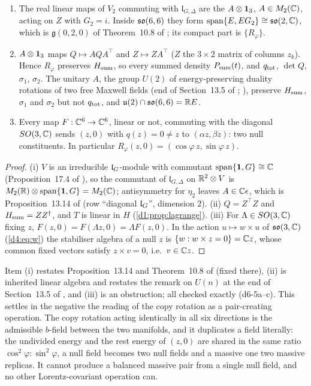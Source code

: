 \begin{proposition}
\label{d6:prop:covariant}
\begin{enumerate}[label=(\roman*),leftmargin=2.2em]
\item The real linear maps of $V_2$ commuting with $\mathfrak l_{G,\Delta}$ are the $A\otimes\mathbf 1_3$, $A\in M_2(\mathbb{C})$, acting on $Z$ with $G_2=i$. Inside
$\mathfrak{so}(6,6)$ they form $\operatorname{span}\{E,EG_2\}\cong\mathfrak{so}(2,\mathbb{C})$, which is $\mathfrak g(0,2,0)$ of Theorem~10.8 of \cite{ES17}; its compact part
is $\{R_\varphi\}$.
\item $A\otimes\mathbf 1_3$ maps $Q\mapsto AQA^{\!\top}$ and $Z\mapsto ZA^{\!\top}$ ($Z$ the $3\times2$ matrix of columns $z_k$). Hence $R_\varphi$ preserves
$H_{\rm sum}$, so every summed density $P_{\rm sum}(t)$, and $q_{\rm tot}$, $\det Q$, $\sigma_1$, $\sigma_2$. The unitary $A$, the group $U(2)$ of
energy-preserving duality rotations of two free Maxwell fields (end of Section~13.5 of \cite{ES17}; \cite{GaillardZumino81}), preserve
$H_{\rm sum}$, $\sigma_1$ and $\sigma_2$ but not $q_{\rm tot}$, and $\mathfrak{u}(2)\cap\mathfrak{so}(6,6)=\mathbb{R} E$.
\item Every map $F:\mathbb{C}^6\to\mathbb{C}^6$, linear or not, commuting with the diagonal $SO(3,\mathbb{C})$ sends $(z,0)$ with $q(z)=0\neq z$ to $(\alpha z,\beta z)$:
two null constituents. In particular $R_\varphi(z,0)=(\cos\varphi\,z,\sin\varphi\,z)$.
\end{enumerate}
\end{proposition}

\begin{proof}
(i) $V$ is an irreducible $\mathfrak l_G$-module with commutant $\operatorname{span}\{\mathbf 1,G\}\cong\mathbb{C}$ (Proposition~17.4 of \cite{ES17}), so the commutant
of $\mathfrak l_{G,\Delta}$ on $\mathbb{R}^2\otimes V$ is $M_2(\mathbb{R})\otimes\operatorname{span}\{\mathbf 1,G\}=M_2(\mathbb{C})$; antisymmetry for $\eta_2$ leaves $A\in\mathbb{C}\epsilon$, which
is Proposition~13.14 of \cite{ES17} (row ``diagonal $\mathfrak l_G$'', dimension $2$). (ii) $Q=Z^{\!\top}Z$ and $H_{\rm sum}=ZZ^\dagger$, and $T$ is linear in
$H$ (\cref{d1:prop:lagrange}). (iii) For $\Lambda\in SO(3,\mathbb{C})$ fixing $z$, $F(z,0)=F(\Lambda z,0)=\Lambda F(z,0)$. In the action $u\mapsto w\times u$
of $\mathfrak{so}(3,\mathbb{C})$ (\eqref{d4:eq:w}) the stabiliser algebra of a null $z$ is $\{w:w\times z=0\}=\mathbb{C} z$, whose common fixed vectors satisfy
$z\times v=0$, i.e.\ $v\in\mathbb{C} z$.
\end{proof}

Item (i) restates Proposition~13.14 and Theorem~10.8 of \cite{ES17} (fixed there), (ii) is inherited linear algebra and restates the remark
on $U(n)$ at the end of Section~13.5 of \cite{ES17}, and (iii) is an obstruction; all checked exactly (d6-5a--c). This settles in the negative the reading of the copy rotation
as a pair-creating operation. The copy rotation acting identically in all six directions is the admissible $b$-field between the two manifolds,
and it duplicates a field literally: the undivided energy and the rest energy of $(z,0)$ are shared in the same ratio
$\cos^2\varphi:\sin^2\varphi$, a null field becomes two null fields and a massive one two massive replicas. It cannot produce a balanced massive
pair from a single null field, and no other Lorentz-covariant operation can.

